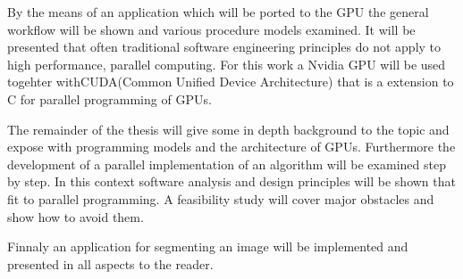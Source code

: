 By the means of an application which will be ported to the \gls{GPU} the general
workflow will be shown and various procedure models examined. It will be
presented that often traditional software engineering principles do not
apply to high performance, parallel computing. For this work a Nvidia \gls{GPU} will
be used togehter with\gls{CUDA}(Common Unified Device Architecture) that is a
extension to C for parallel programming of GPUs. 

The remainder of the thesis will give some in depth background to the topic and
expose with programming models and the architecture of GPUs. Furthermore the
development of a parallel implementation of an algorithm will be examined step
by step. In this context software analysis and design principles will be shown
that fit to parallel programming. A feasibility study will cover major obstacles
and show how to avoid them.

Finnaly an application for segmenting an image will be implemented and presented
in all aspects to the reader.
